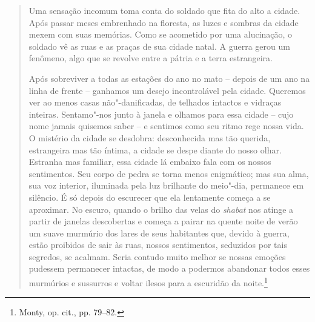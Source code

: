 \begin{quote}
Uma sensação incomum toma conta do soldado que fita do alto a cidade.
Após passar meses embrenhado na floresta, as luzes e sombras da cidade
mexem com suas memórias. Como se acometido por uma alucinação, o soldado
vê as ruas e as praças de sua cidade natal. A guerra gerou um fenômeno,
algo que se revolve entre a pátria e a terra estrangeira.

Após sobreviver a todas as estações do ano no mato -- depois de um ano na
linha de frente -- ganhamos um desejo incontrolável pela cidade. Queremos
ver ao menos casas não"-danificadas, de telhados intactos e vidraças
inteiras. Sentamo"-nos junto à janela e olhamos para essa cidade -- cujo
nome jamais quisemos saber -- e sentimos como seu ritmo rege nossa vida.
O mistério da cidade se desdobra: desconhecida mas tão querida,
estrangeira mas tão íntima, a cidade se despe diante do nosso olhar.
Estranha mas familiar, essa cidade lá embaixo fala com os nossos
sentimentos. Seu corpo de pedra se torna menos enigmático; mas sua alma,
sua voz interior, iluminada pela luz brilhante do meio"-dia, permanece em
silêncio. É só depois do escurecer que ela lentamente começa a se
aproximar. No escuro, quando o brilho das velas do \textit{shabat} nos atinge a
partir de janelas descobertas e começa a pairar na quente noite de verão um
suave murmúrio dos lares de seus habitantes que, devido à guerra, estão
proibidos de sair às ruas, nossos sentimentos,
seduzidos por tais segredos, se acalmam. Seria contudo muito melhor se
nossas emoções pudessem permanecer intactas, de modo a podermos
abandonar todos esses murmúrios e sussurros e voltar ilesos para a
escuridão da noite.\footnote{Monty, op. cit., pp. 79--82.}
\end{quote}

